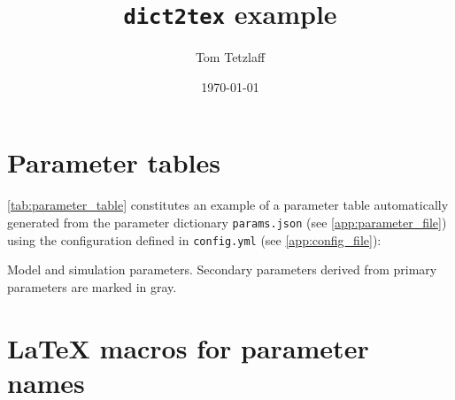 \documentclass[10pt,a4paper,american]{article}
\begin{document}
\title{\texttt{dict2tex} example}
\author{Tom Tetzlaff}
\date{\today}

\maketitle
\tableofcontents

\section{Parameter tables}

\cref{tab:parameter_table} constitutes an example of a parameter table automatically generated from the parameter dictionary \texttt{params.json} (see \cref{app:parameter_file}) using the configuration defined in \texttt{config.yml} (see \cref{app:config_file}): 
\begin{table}[ht!]
\begin{center}
  \parbox{0.8\linewidth}{       %
    \small%
    \centering%
    \renewcommand{\arraystretch}{1.5}%
    \noindent%
    \caption{Model and simulation parameters. Secondary parameters derived from primary parameters are marked in gray.}
    \label{tab:parameter_table}
  }
\end{center}
\end{table}

\section{LaTeX macros for parameter names}

\end{document}
